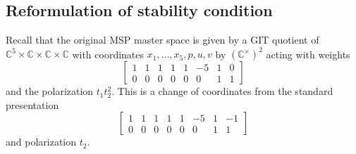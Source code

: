\documentclass[10pt]{amsart}
\theoremstyle{definition}
\theoremstyle{remark}
\theoremstyle{plain}
\theoremstyle{definition}
\theoremstyle{remark}
\newcommand{\C}{\mathbb{C}}
\newcommand{\1}{\mathbf{1}}
\newcommand{\2}{\mathbf{2}}
\newcommand{\3}{\mathbf{3}}
\begin{document}
\subsection{Reformulation of stability condition}%
\label{sub:Reformulation of stability condition}

Recall that the original MSP master space is given by a GIT quotient of $\C^5 \times \C \times \C \times \C$ with coordinates $x_1, \ldots, x_5, p, u,v$ by $(\C^{\times})^2$ acting with weights
\[ \begin{bmatrix}
    1 & 1 & 1 & 1 & 1 & -5 & 1 & 0 \\
    0 & 0 & 0 & 0 & 0 & 0 & 1 & 1
\end{bmatrix} \]
and the polarization $t_1 t_2^2$. This is a change of coordinates from the standard presentation
\[ \begin{bmatrix}
    1 & 1 & 1 & 1 & 1 & -5 & 1 & -1 \\
    0 & 0 & 0 & 0 & 0 & 0 & 1 & 1
\end{bmatrix} \]
and polarization $t_2$.
\end{document}
